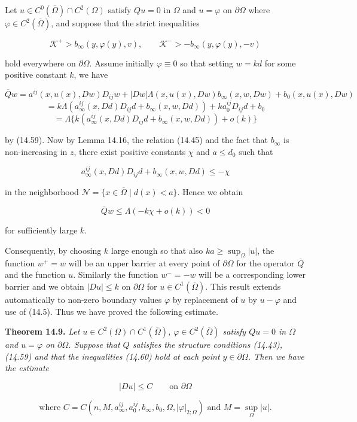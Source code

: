 
Let $u \in C^0(\overline{\Omega}) \cap C^2(\Omega)$ satisfy $Qu = 0$ in $\Omega$ and
$u = \varphi$ on $\partial\Omega$ where $\varphi \in C^2(\overline{\Omega})$, and
suppose that the strict inequalities

\begin{equation}\tag{14.60}
\mathcal{K}^+ > b_\infty(y,\varphi(y),v), \qquad
\mathcal{K}^- > -b_\infty(y,\varphi(y),-v)
\end{equation}

hold everywhere on $\partial\Omega$. Assume initially $\varphi \equiv 0$ so that setting
$w = kd$ for some positive constant $k$, we have

\[
\overline{Q}w = a^{ij}(x,u(x),Dw)D_{ij}w + |Dw|\Lambda(x,u(x),Dw)b_\infty(x,w,Dw)
+ b_0(x,u(x),Dw)
\]
\[
= k\Lambda(a^{ij}_\infty(x,Dd)D_{ij}d + b_\infty(x,w,Dd)) + ka^{ij}_0D_{ij}d + b_0
\]
\[
= \Lambda\{k(a^{ij}_\infty(x,Dd)D_{ij}d + b_\infty(x,w,Dd)) + o(k)\}
\]

by (14.59). Now by Lemma 14.16, the relation (14.45) and the fact that $b_\infty$ is non-increasing in $z$, there exist positive constants $\chi$ and $a \le d_0$ such that

\[
a^{ij}_\infty(x,Dd)D_{ij}d + b_\infty(x,w,Dd) \le -\chi
\]

in the neighborhood $\mathcal{N} = \{x \in \overline{\Omega}\mid d(x) < a\}$. Hence we obtain

\[
\overline{Q}w \le \Lambda(-k\chi + o(k)) < 0
\]

for sufficiently large $k$.

Consequently, by choosing $k$ large enough so that also $ka \ge \sup_{\Omega}|u|$, the function
$w^+ = w$ will be an upper barrier at every point of $\partial\Omega$ for the operator $\overline{Q}$ and the function $u$. Similarly the function $w^- = -w$ will be a corresponding lower barrier and we obtain $|Du| \le k$ on $\partial\Omega$ for $u \in C^1(\overline{\Omega})$. This result extends automatically to non-zero boundary values $\varphi$ by replacement of $u$ by $u - \varphi$ and use of (14.5). Thus we have proved the following estimate.

\begin{theorem}\label{gt14-boundary-gradient-14-9}
\noindent\textbf{Theorem 14.9.} \textit{Let $u \in C^2(\Omega) \cap C^1(\overline{\Omega})$, $\varphi \in C^2(\overline{\Omega})$ satisfy $Qu = 0$ in $\Omega$ and $u = \varphi$ on $\partial\Omega$. Suppose that $Q$ satisfies the structure conditions (14.43), (14.59) and that the inequalities (14.60) hold at each point $y \in \partial\Omega$. Then we have the estimate}

\begin{equation}\tag{14.61}
|Du| \le C \qquad \text{on } \partial\Omega
\end{equation}

\[
\text{where } C = C(n,M,a^{ij}_\infty,a^{ij}_0,b_\infty,b_0,\Omega,|\varphi|_{2;\Omega})
\text{ and } M = \sup_{\Omega}|u|.
\]
\end{theorem}

